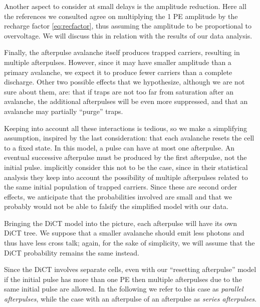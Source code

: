 Another aspect to consider at small delays is the amplitude reduction. Here all
the references we consulted agree on multiplying the 1 PE amplitude by the
recharge factor \eqref{eq:recfactor}, thus assuming the amplitude to be
proportional to overvoltage. We will discuss this in relation with the results
of our data analysis.

Finally, the afterpulse avalanche itself produces trapped carriers, resulting
in multiple afterpulses. However, since it may have smaller amplitude than a
primary avalanche, we expect it to produce fewer carriers than a complete
discharge. Other two possible effects that we hypothesize, although we are not
sure about them, are: that if traps are not too far from saturation after an
avalanche, the additional afterpulses will be even more suppressed, and that an
avalanche may partially ``purge'' traps.


Keeping into account all these interactions is tedious, so we make a
simplifying assumption, inspired by the last consideration: that each avalanche
resets the cell to a fixed state. In this model, a pulse can have at most one
afterpulse. An eventual successive afterpulse must be produced by the first
afterpulse, not the initial pulse. \cite{cova1991} implicitly consider this not
to be the case, since in their statistical analysis they keep into account the
possibility of multiple afterpulses related to the same initial population of
trapped carriers. Since these are second order effects, we anticipate that the
probabilities involved are small and that we probably would not be able to
falsify the simplified model with our data.


Bringing the DiCT model into the picture, each afterpulse will have its own
DiCT tree. We suppose that a smaller avalanche should emit less photons and
thus have less cross talk; again, for the sake of simplicity, we will assume
that the DiCT probability remains the same instead.

Since the DiCT involves separate cells, even with our ``resetting afterpulse''
model if the initial pulse has more than one PE then multiple afterpulses due
to the same initial pulse are allowed. In the following we refer to this case
as \emph{parallel afterpulses}, while the case with an afterpulse of an
afterpulse as \emph{series afterpulses}.

